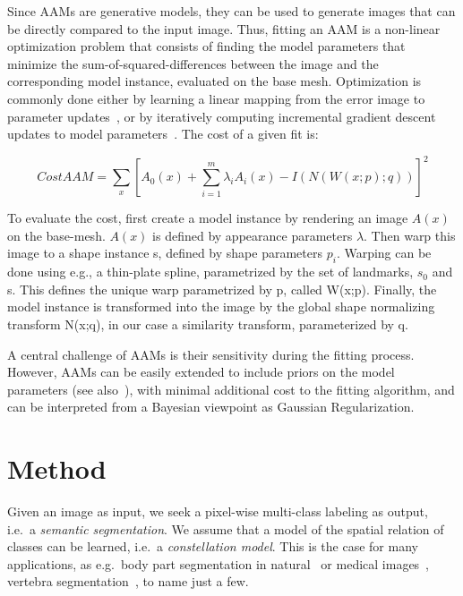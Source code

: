 \documentclass[10pt,twocolumn,letterpaper]{article}
\begin{document}
Since AAMs are generative models, they can be used to generate images that can be directly compared to the input image.  Thus, fitting an AAM is a non-linear optimization problem that consists of finding the model parameters that minimize the sum-of-squared-differences between the image and the corresponding model instance, evaluated on the base mesh.  Optimization is commonly done either by learning a linear mapping from the error image to parameter updates~\cite{CootesAAM2001}, or by iteratively computing incremental gradient descent updates to model parameters~\cite{BakerAAM2004}.  The cost of a given fit is:

\begin{equation}
CostAAM = \sum_{x} [A_0(x) + \sum_{i=1}^m \lambda_i A_i(x) - I(N(W(x;p);q))]^2
\label{eq:costAAM}
\end{equation} 

To evaluate the cost, first create a model instance by rendering an image $A(x)$ on the base-mesh. $A(x)$ is defined by appearance parameters $\lambda$. Then warp this image to a shape instance s, defined by shape parameters $p_i$.  Warping can be done using e.g., a thin-plate spline, parametrized by the set of landmarks, $s_0$ and s. This defines the unique warp parametrized by p, called W(x;p).  Finally, the model instance is transformed into the image by the global shape normalizing transform N(x;q), in our case a similarity transform, parameterized by q.

A central challenge of AAMs is their sensitivity during the fitting process. 
However, AAMs can be easily extended to include priors on the model parameters (see also~\cite{BakerAAM2004}), with minimal additional cost to the fitting algorithm, and can be interpreted from a Bayesian viewpoint as Gaussian Regularization.
%



\section{Method}
\label{sec:method}
Given an image as input, we seek a pixel-wise multi-class labeling as output, i.e.\ a \emph{semantic segmentation}. 
%
We assume that a model of the spatial relation of classes can be learned, i.e.\ a \emph{constellation model}. This is the case for many applications, as e.g.\ body part segmentation in natural~\cite{PoseMachinesECCV2014} or medical images~\cite{SeifertAnatomicalSPIE2009}, vertebra segmentation~\cite{Glocker2012,Glocker2013}, to name just a few. 
%
\end{document}
